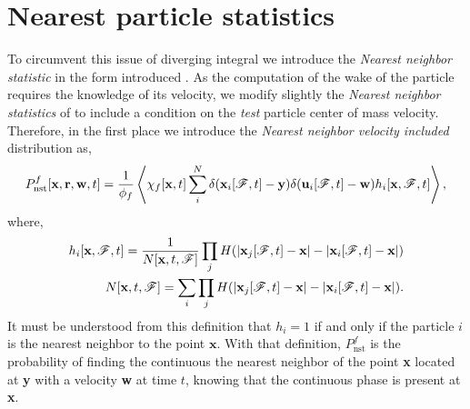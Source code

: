 \section{Nearest particle statistics}

To circumvent this issue of diverging integral we introduce the \textit{Nearest neighbor statistic} in the form introduced \citet{zhang2021ensemble}. 
As the computation of the wake of the particle requires the knowledge of its velocity, we modify slightly the \textit{Nearest neighbor statistics} of \citet{zhang2021ensemble} to include a condition on the \textit{test } particle center of mass velocity.
Therefore, in the first place we introduce the \textit{Nearest neighbor velocity included} distribution as, 
\begin{equation}
    P_\text{nst}^f[\textbf{x},\textbf{r},\textbf{w},t]
    = \frac{1}{\phi_f}\left<
        \chi_f[\textbf{x},t]
        \sum_i^N 
        \delta(\textbf{x}_i[\mathscr{F},t]-\textbf{y})
        \delta(\textbf{u}_i[\mathscr{F},t]-\textbf{w})
        h_i[\textbf{x},\mathscr{F},t]
    \right>,
\end{equation}
where,
\begin{align}
    h_i[\textbf{x},\mathscr{F},t]
    = \frac{1}{N[\textbf{x},t,\mathscr{F}]}
    \prod_j H(|\textbf{x}_j[\mathscr{F},t] - \textbf{x}| - |\textbf{x}_i[\mathscr{F},t] - \textbf{x}|)\\
    N[\textbf{x},t,\mathscr{F}]
    = \sum_i\prod_jH(|\textbf{x}_j[\mathscr{F},t] - \textbf{x}| - |\textbf{x}_i[\mathscr{F},t] - \textbf{x}|).
\end{align}
It must be understood from this definition that $h_i=1$ if and only if the particle $i$ is the nearest neighbor to the point $\textbf{x}$. 
With that definition, $P_\text{nst}^f$ is the probability of finding the continuous the nearest neighbor of the point \textbf{x} located at \textbf{y} with a velocity \textbf{w} at time $t$, knowing that the continuous phase is present at \textbf{x}. 


